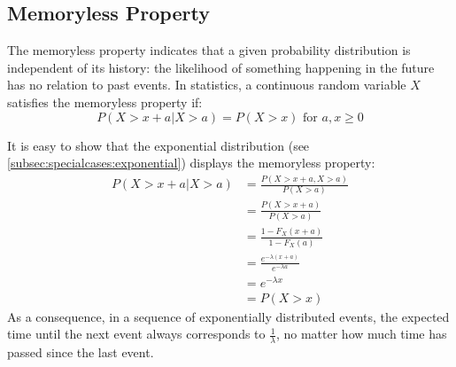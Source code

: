 \documentclass[12pt]{article}
\begin{document}

\pagebreak
\subsection{Memoryless Property}
The memoryless property indicates that a given probability distribution is independent of its history: the likelihood of
something happening in the future has no relation to past events. In statistics, a continuous random variable $X$
satisfies the memoryless property if:
 \begin{equation}
	P(X>x+a | X>a) = P(X>x)\text{ for }a, x \geq 0
 \end{equation}

 It is easy to show that the exponential distribution (see \autoref{subsec:specialcases:exponential}) displays the
 memoryless property:
 \begin{equation}
	 \begin{split}
		 P(X>x+a | X>a)	&=	\frac{P(X>x+a, X>a)}{P(X>a)}\\
		 				&=	\frac{P(X>x+a)}{P(X>a)}\\
						&=	\frac{1-F_X(x+a)}{1-F_X(a)}\\
						&=	\frac{e^{-\lambda(x+a)}}{e^{-\lambda a}}\\
						&=	e^{-\lambda x}\\
						&=	P(X>x)
	 \end{split}
 \end{equation}
As a consequence, in a sequence of exponentially distributed events, the expected time until the next event always
corresponds to $\frac{1}{\lambda}$, no matter how much time has passed since the last event.
\end{document}
